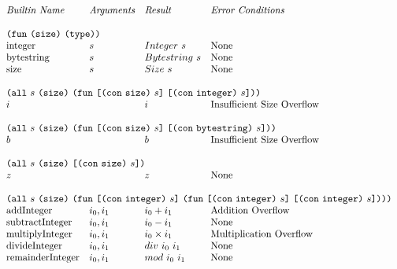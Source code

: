 \documentclass[../main.tex]{subfiles}
\begin{document}
\begin{figure*}[t]
    \centering
    \footnotesize
    \[\begin{array}{llll}
        \textit{Builtin Name}               & \textit{Arguments} & \textit{Result} & \textit{Error Conditions}\\
        &&\\
        
        \multicolumn{4}{l}{\funK{\sizeK{}}{\typeK{}}}\\
        \mathrm{integer} & s & Integer ~ s & \textrm{None}\\
        \mathrm{bytestring} & s & Bytestring ~ s & \textrm{None}\\
        \mathrm{size} & s & Size ~ s & \textrm{None}\\
        &&\\
        
        \multicolumn{4}{l}{
          \allT{s}{\sizeK{}}{
            \funT{\appT{\con{\conSizeType{}}}{s}}
                 {\appT{\conT{\conIntegerType{s}}}{s}}}}\\
        i & & i & \textrm{Insufficient Size Overflow}\\
        &&\\
        
        \multicolumn{4}{l}{
          \allT{s}{\sizeK{}}{
            \funT{\appT{\con{\conSizeType{}}}{s}}
                 {\appT{\conT{\conBytestringType{}}}{s}}}}\\
        b & & b & \textrm{Insufficient Size Overflow}\\
        &&\\
        
        \multicolumn{4}{l}{
          \allT{s}{\sizeK{}}{
            \appT{\conT{\conSizeType{}}}{s}}}\\
        z & & z & \textrm{None}\\
        &&\\
        
        \multicolumn{4}{l}{
          \allT{s}{\sizeK{}}{
            \funT{\appT{\conT{\conIntegerType{}}}{s}}
                 {\funT{\appT{\conT{\conIntegerType{}}}{s}}
                       {\appT{\conT{\conIntegerType{}}}{s}}}}}\\
        \mathrm{addInteger}                 &  i_0 , i_1   &   i_0 + i_1         &   \textrm{Addition Overflow}   \\
        \mathrm{subtractInteger}            &  i_0 , i_1   &   i_0 - i_1         &   \textrm{None}       \\
        \mathrm{multiplyInteger}            &  i_0 , i_1   &   i_0 \times i_1    &   \textrm{Multiplication Overflow}   \\
        \mathrm{divideInteger}              &  i_0 , i_1   &   div ~ i_0 ~ i_1   &   \textrm{None}       \\
        \mathrm{remainderInteger}           &  i_0 , i_1   &   mod ~ i_0 ~ i_1   &   \textrm{None}       \\
        &&\\
        

\end{array}\]
\end{figure*}
\end{document}
